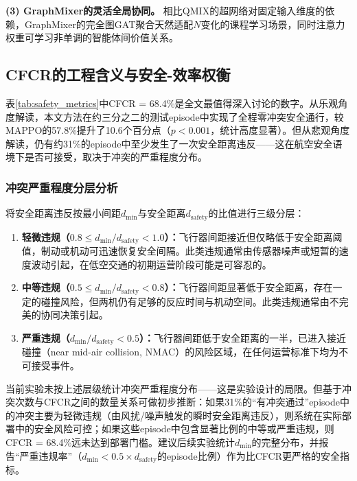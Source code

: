 \documentclass[12pt,a4paper,UTF8]{ctexart}
\begin{document}
\textbf{(3) GraphMixer的灵活全局协同。} 相比QMIX的超网络对固定输入维度的依赖，GraphMixer的完全图GAT聚合天然适配$N$变化的课程学习场景，同时注意力权重可学习非单调的智能体间价值关系。

\subsection{CFCR的工程含义与安全-效率权衡}

表\ref{tab:safety_metrics}中CFCR = 68.4\%是全文最值得深入讨论的数字。从乐观角度解读，本文方法在约三分之二的测试episode中实现了全程零冲突安全通行，较MAPPO的57.8\%提升了10.6个百分点（$p<0.001$，统计高度显著）。但从悲观角度解读，仍有约31\%的episode中至少发生了一次安全距离违反——这在航空安全语境下是否可接受，取决于冲突的严重程度分布。

\subsubsection{冲突严重程度分层分析}

将安全距离违反按最小间距$d_{\min}$与安全距离$d_{\text{safety}}$的比值进行三级分层：

\begin{enumerate}[label=(\arabic*)]
    \item \textbf{轻微违规（$0.8 \leq d_{\min}/d_{\text{safety}} < 1.0$）：}飞行器间距接近但仅略低于安全距离阈值，制动或机动可迅速恢复安全间隔。此类违规通常由传感器噪声或短暂的速度波动引起，在低空交通的初期运营阶段可能是可容忍的。
    \item \textbf{中等违规（$0.5 \leq d_{\min}/d_{\text{safety}} < 0.8$）：}飞行器间距显著低于安全距离，存在一定的碰撞风险，但两机仍有足够的反应时间与机动空间。此类违规通常由不完美的协同决策引起。
    \item \textbf{严重违规（$d_{\min}/d_{\text{safety}} < 0.5$）：}飞行器间距低于安全距离的一半，已进入接近碰撞（near mid-air collision, NMAC）的风险区域，在任何运营标准下均为不可接受事件。
\end{enumerate}

当前实验未按上述层级统计冲突严重程度分布——这是实验设计的局限。但基于冲突次数与CFCR之间的数量关系可做初步推断：如果31\%的``有冲突通过''episode中的冲突主要为轻微违规（由风扰/噪声触发的瞬时安全距离违反），则系统在实际部署中的安全风险可控；如果这些episode中包含显著比例的中等或严重违规，则CFCR = 68.4\%远未达到部署门槛。建议后续实验统计$d_{\min}$的完整分布，并报告``严重违规率''（$d_{\min} < 0.5 \times d_{\text{safety}}$的episode比例）作为比CFCR更严格的安全指标。
\end{document}
